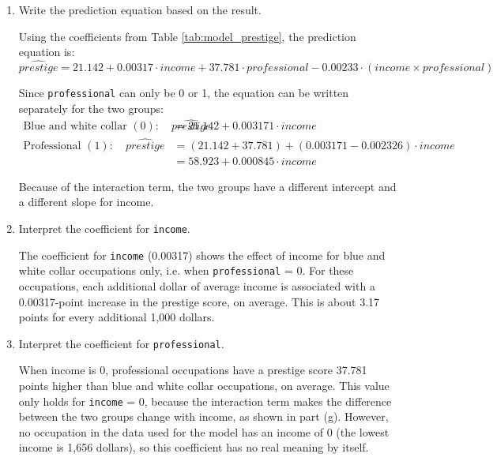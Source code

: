 \documentclass[12pt,letterpaper]{article}
\begin{document}
\begin{enumerate}
	
	
	\noindent The results of the model are shown in Table \ref{tab:model_prestige}.
	
	
	
	\vspace{1cm}
	\item [(c)]
	Write the prediction equation based on the result.
	
	\noindent Using the coefficients from Table \ref{tab:model_prestige}, the prediction equation is:
	\begin{equation*}
		\widehat{prestige} = 21.142 + 0.00317 \cdot income + 37.781 \cdot professional - 0.00233 \cdot (income \times professional)
	\end{equation*}
	
	\noindent Since \texttt{professional} can only be 0 or 1, the equation can be written separately for the two groups:
	\begin{align*}
		\text{Blue and white collar } (0): \quad \widehat{prestige} &= 21.142 + 0.003171 \cdot income \\
		\text{Professional } (1): \quad \widehat{prestige} &= (21.142 + 37.781) + (0.003171 - 0.002326) \cdot income \\
		&= 58.923 + 0.000845 \cdot income
	\end{align*}
	
	\noindent Because of the interaction term, the two groups have a different intercept and a different slope for income.
	
	\vspace{1cm}
	\item [(d)]
	Interpret the coefficient for \texttt{income}.
	
	\noindent The coefficient for \texttt{income} (0.00317) shows the effect of income for blue and white collar occupations only, i.e. when \texttt{professional} = 0. For these occupations, each additional dollar of average income is associated with a 0.00317-point increase in the prestige score, on average. This is about 3.17 points for every additional 1,000 dollars.
	
	
	\vspace{1cm}	
	\item [(e)]
	Interpret the coefficient for \texttt{professional}.
	
	\noindent When income is 0, professional occupations have a prestige score 37.781 points higher than blue and white collar occupations, on average. This value only holds for \texttt{income} = 0, because the interaction term makes the difference between the two groups change with income, as shown in part (g). However, no occupation in the data used for the model has an income of 0 (the lowest income is 1,656 dollars), so this coefficient has no real meaning by itself.
	

\end{enumerate}
\end{document}
